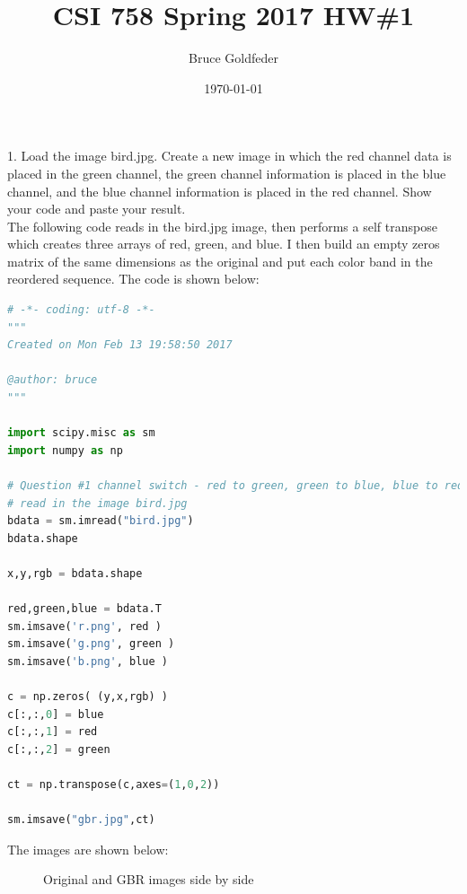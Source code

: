 \documentclass[12pt]{article}
\title{CSI 758 Spring 2017 HW\#1}
\author{Bruce Goldfeder}
\date{\today}
\begin{document}
\maketitle
{}

1.	Load the image bird.jpg. Create a new image in which the red channel data is placed in the green channel, the green channel information is placed in the blue channel, and the blue channel information is placed in the red channel. Show your code and paste your result.\\

The following code reads in the bird.jpg image, then performs a self transpose which creates three arrays of red, green, and blue.  I then build an empty zeros matrix of the same dimensions as the original and put each color band in the reordered sequence.  The code is shown below:
\begin{lstlisting}[language=Python]
# -*- coding: utf-8 -*-
"""
Created on Mon Feb 13 19:58:50 2017

@author: bruce
"""

import scipy.misc as sm
import numpy as np

# Question #1 channel switch - red to green, green to blue, blue to red
# read in the image bird.jpg
bdata = sm.imread("bird.jpg")
bdata.shape

x,y,rgb = bdata.shape

red,green,blue = bdata.T
sm.imsave('r.png', red )
sm.imsave('g.png', green )
sm.imsave('b.png', blue )

c = np.zeros( (y,x,rgb) ) 
c[:,:,0] = blue
c[:,:,1] = red
c[:,:,2] = green
 
ct = np.transpose(c,axes=(1,0,2))

sm.imsave("gbr.jpg",ct)
\end{lstlisting}
The images are shown below:\\

\begin{figure}[ht!]%
    \centering
    \qquad
    \caption{Original and GBR images side by side}%
    \label{fig:example}%
\end{figure}
\end{document}
